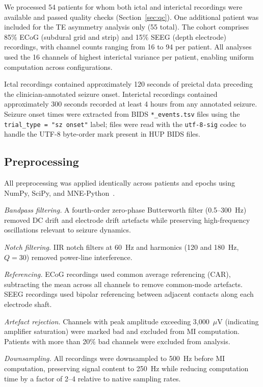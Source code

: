 \documentclass[a4paper,fleqn]{cas-dc}
\begin{document}
We processed 54 patients for whom both ictal and interictal recordings
were available and passed quality checks (Section~\ref{sec:qc}).
%
One additional patient was included for the TE asymmetry analysis only
(55 total).
%
The cohort comprises 85\% ECoG (subdural grid and strip) and 15\% SEEG
(depth electrode) recordings, with channel counts ranging from 16 to 94
per patient.
%
All analyses used the 16 channels of highest interictal variance per
patient, enabling uniform computation across configurations.

Ictal recordings contained approximately 120 seconds of preictal data
preceding the clinician-annotated seizure onset.
%
Interictal recordings contained approximately 300 seconds recorded at
least 4 hours from any annotated seizure.
%
Seizure onset times were extracted from BIDS \texttt{*\_events.tsv}
files using the \texttt{trial\_type = "sz onset"} label; files were
read with the \texttt{utf-8-sig} codec to handle the UTF-8 byte-order
mark present in HUP BIDS files.

\subsection{Preprocessing}

All preprocessing was applied identically across patients and epochs
using NumPy, SciPy, and MNE-Python~\citep{gramfort2013}.

\textit{Bandpass filtering.}
A fourth-order zero-phase Butterworth filter (0.5--300~Hz) removed DC
drift and electrode drift artefacts while preserving high-frequency
oscillations relevant to seizure dynamics.

\textit{Notch filtering.}
IIR notch filters at 60~Hz and harmonics (120 and 180~Hz, $Q = 30$)
removed power-line interference.

\textit{Referencing.}
ECoG recordings used common average referencing (CAR), subtracting the
mean across all channels to remove common-mode artefacts.
%
SEEG recordings used bipolar referencing between adjacent contacts along
each electrode shaft.

\textit{Artefact rejection.}
Channels with peak amplitude exceeding 3{,}000~$\mu$V (indicating
amplifier saturation) were marked bad and excluded from MI computation.
%
Patients with more than 20\% bad channels were excluded from analysis.

\textit{Downsampling.}
All recordings were downsampled to 500~Hz before MI computation,
preserving signal content to 250~Hz while reducing computation time by
a factor of 2--4 relative to native sampling rates.
\end{document}
